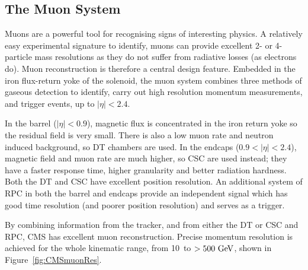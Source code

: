 
\subsection{The Muon System}
Muons are a powerful tool for recognising signs of interesting physics. 
A relatively easy experimental signature to identify, muons can provide excellent 2- or 4-particle mass resolutions as they do not suffer from radiative losses (as electrons do).
Muon reconstruction is therefore a central design feature. 
Embedded in the iron flux-return yoke of the solenoid, the muon system combines three methods of gaseous detection to identify, carry out high resolution momentum measurements, and trigger events, up to $|\eta|<2.4$.

In the barrel ($|\eta|<0.9$), magnetic flux is concentrated in the iron return yoke so the residual field is very small.
There is also a low muon rate and neutron induced background, so \ac{DT} chambers are used.
In the endcaps ($0.9<|\eta|<2.4$), magnetic field and muon rate are much higher, so \ac{CSC} are used instead; 
they have a faster response time, higher granularity and better radiation hardness.
Both the \ac{DT} and \ac{CSC} have excellent position resolution.
An additional system of \ac{RPC} in both the barrel and endcaps provide an independent signal which has good time resolution (and poorer position resolution) and serves as a trigger.

By combining information from the tracker, and from either the \ac{DT} or \ac{CSC} and \ac{RPC}, \ac{CMS} has excellent muon reconstruction. 
Precise momentum resolution is achieved for the whole kinematic range, from 10~\GeV to $>500~\mathrm{GeV}$, shown in  
Figure~\ref{fig:CMSmuonRes}. 

